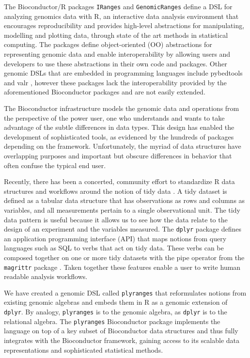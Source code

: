 \documentclass[]{article}
\begin{document}
The Bioconductor/R packages \texttt{IRanges} and \texttt{GenomicRanges}
\autocites{r-core}{Lawrence2013-wg}{Huber2015-ei} define a DSL for
analyzing genomics data with R, an interactive data analysis environment
that encourages reproducibility and provides high-level abstractions for
manipulating, modelling and plotting data, through state of the art
methods in statistical computing. The packages define object-oriented
(OO) abstractions for representing genomic data and enable
interoperability by allowing users and developers to use these
abstractions in their own code and packages. Other genomic DSLs that are
embedded in programming languages include pybedtools and valr
\autocites{Dale2011-js}{Kent2017}, however these packages lack the
interoperability provided by the aforementioned Bioconductor packages
and are not easily extended.

The Bioconductor infrastructure models the genomic data and operations
from the perspective of the power user, one who understands and wants to
take advantage of the subtle differences in data types. This design has
enabled the development of sophisticated tools, as evidenced by the
hundreds of packages depending on the framework. Unfortunately, the
myriad of data structures have overlapping purposes and important but
obscure differences in behavior that often confuse the typical end user.

Recently, there has been a concerted, community effort to standardize R
data structures and workflows around the notion of tidy data
\cite{Wickham2014-jc}. A tidy dataset is defined as a tabular data
structure that has observations as rows and columns as variables, and
all measurements pertain to a single observational unit. The tidy data
pattern is useful because it allows us to see how the data relate to the
design of an experiment and the variables measured. The \texttt{dplyr}
package \cite{Wickham2017-dplyr} defines an application programming
interface (API) that maps notions from query languages such as SQL to
verbs that act on tidy data. These verbs can be composed together on one
or more tidy datasets with the pipe operator from the \texttt{magrittr}
package \cite{R-magrittr}. Taken together these features enable a user
to write human readable analysis workflows.

We have created a genomic DSL called \texttt{plyranges} that
reformulates notions from existing genomic algebras and embeds them in R
as a genomic extension of \texttt{dplyr}. By analogy, \texttt{plyranges}
is to the genomic algebra, as \texttt{dplyr} is to the relational
algebra. The \texttt{plyranges} Bioconductor package implements the
language on top of a key subset of Bioconductor data structures and thus
fully integrates with the Bioconductor framework, gaining access to its
scalable data representations and sophisticated statistical methods.
\end{document}
